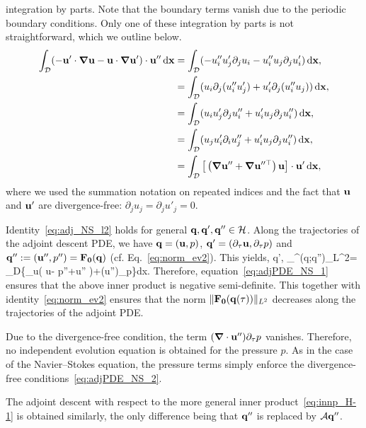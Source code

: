 \documentclass{article}
\begin{document}
integration by parts. Note that the boundary terms vanish due to the periodic boundary conditions.
Only one of these integration by parts is not straightforward, which we
outline below.
\begin{align*}
\int_{\mathcal D}(-\mathbf u'\cdot\mbox{\boldmath $\nabla$}\mathbf u-\mathbf u\cdot\mbox{\boldmath $\nabla$}\mathbf u')\cdot\mathbf u''\,\mathrm d\mathbf x &=
\int_{\mathcal D}(-u''_iu'_j\partial_ju_i-u''_iu_j\partial_ju'_i)\,\mathrm d\mathbf x,\\
&=\int_{\mathcal D}(u_i\partial_j(u''_iu'_j)+u'_i\partial_j(u''_iu_j))\,\mathrm d\mathbf x,\\
&=\int_{\mathcal D}(u_iu'_j\partial_ju''_i+u'_iu_j\partial_ju''_i)\,\mathrm d\mathbf x,\\
&=\int_{\mathcal D}(u_ju'_i\partial_iu''_j+u'_iu_j\partial_ju''_i)\,\mathrm d\mathbf x,\\
&=\int_{\mathcal D}\big[\left(\mbox{\boldmath $\nabla$}\mathbf u''+\mbox{\boldmath $\nabla$}\mathbf u''^\top\right)\mathbf u\big]\cdot \mathbf
u'\,\mathrm d\mathbf x,
\end{align*}
where we used the summation notation on repeated indices and the fact that $\mathbf u$ and $\mathbf u'$
are divergence-free: $\partial_ju_j=\partial_ju'_j=0$.

Identity~\eqref{eq:adj_NS_l2} holds for general $\mathbf q,\mathbf q',\mathbf q''\in\mathcal H$.
Along the trajectories of the adjoint descent PDE, we have
$\mathbf q=(\mathbf u,p)$,
$\mathbf q'=(\partial_\tau\mathbf u,\partial_\tau p)$ and
$\mathbf q'':=(\mathbf u'',p'')=\mathbf F_{\mathbf 0}(\mathbf q)$ (cf.
Eq.~\eqref{eq:norm_ev2}). This yields,
\beq
\langle\vc q', _{}^\dagger(\vc q;\vc q'')\rangle_{L^2}=
\int_{\mathcal D}\left\{\partial_\tau \vc u\cdot\left( \vc u-\bnabla
p''+\nu\Delta \vc u'' \right)+(\bnabla\cdot\vc u'')\partial_\tau p\right\}\mathrm d\vc x.
\eeq
Therefore, equation~\eqref{eq:adjPDE_NS_1} ensures that the above inner product is
negative semi-definite. This together with identity~\eqref{eq:norm_ev2} ensures that
the norm $\|\mathbf F_{\mathbf 0}(\mathbf q(\tau))\|_{L^2}$ decreases along the trajectories of the adjoint PDE.

Due to the divergence-free condition, the term $(\mbox{\boldmath $\nabla$}\cdot\mathbf u'')\partial_\tau p$
vanishes. Therefore, no independent evolution equation is obtained for the pressure $p$.
As in the case of the Navier--Stokes equation, the pressure terms simply
enforce the divergence-free conditions~\eqref{eq:adjPDE_NS_2}.

The adjoint descent with respect to the more general inner product~\eqref{eq:innp_H-1}
is obtained similarly, the only difference being that
$\mathbf q''$ is replaced by $\mathcal A\mathbf q''$.
\end{document}
